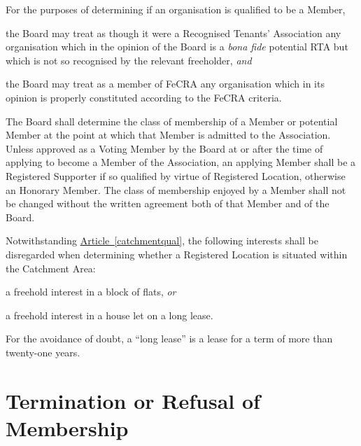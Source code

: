 \documentclass[12pt]{article}
\newcommand{\EC}[0]{Board}
\newcommand{\Exec}[0]{\EC{} }
\newcommand{\RTA}[0]{Recognised Tenants' Association}
\newcommand{\avoiddoubt}[0]{For the avoidance of doubt}
\newcommand{\ITand}[0]{\textit{and}}
\newcommand{\ITor}[0]{\textit{or}}
\newcommand{\articleref}[1]{\hyperref[#1]{Article~\ref*{#1}}}
\begin{document}
\begin{constenum}
  \item For the purposes of determining if an organisation is qualified
    to be a Member,
    \begin{constenum}
      \item
        the \Exec may treat as though it were a \RTA{} any organisation which in
        the opinion of the \Exec is a \textit{bona fide} potential RTA
        but which is not so recognised by the relevant
        freeholder, \ITand
      \item the \Exec may treat as a member of FeCRA any
        organisation which in its opinion is properly constituted according
        to the FeCRA criteria.
    \end{constenum}


  \item The \Exec shall determine the class of membership of a Member
    or potential Member at the point at which that Member is admitted
    to the Association. Unless approved as a Voting Member by the
    \Exec at or after the time of applying to become a Member of the
    Association, an applying Member shall be a Registered Supporter if
    so qualified by virtue of Registered Location, otherwise an
    Honorary Member.  The class of membership enjoyed by a Member
    shall not be changed without the written agreement both of that
    Member and of the \EC{}.

  \item Notwithstanding \articleref{catchmentqual}, the following interests
    shall be disregarded when determining whether a Registered Location
    is situated within the Catchment Area:
    \begin{constenum}
      \item a freehold interest in a block of flats, \ITor
      \item a freehold interest in a house let on a long lease.
    \end{constenum}

    \avoiddoubt, a ``long lease'' is a lease for a term of more than
    twenty-one years.


\end{constenum}


\section{Termination or Refusal of Membership}
\end{document}
